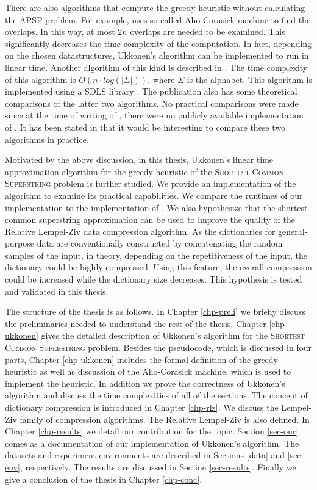\documentclass[english,twoside,censored,csm,algorithms-track-2020]{HYthesisML}
\theoremstyle{plain}
\theoremstyle{definition}
\begin{document}
There are also algorithms that compute the greedy heuristic without calculating the APSP problem.
For example, \citep{Ukkonen90} uses so-called Aho-Corasick machine to find the overlaps. In this way,
at most $2n$ overlaps are needed to be examined. This significantly decreases the time complexity of
the computation. In fact, depending on the chosen datastructures, Ukkonen's algorithm can be implemented
to run in linear time.
Another algorithm of this kind is described in \citep{Alanko17}.
The time complexity of this
algorithm is $O(n\cdot log(|\Sigma|))$, where $\Sigma$ is the alphabet.
This algorithm is implemented using a SDLS library  \citep{SDLS}. The publication also has some
theoretical comparisons of the latter two algorithms. No practical comparisons were made since at the
time of writing of \citep{Alanko17}, there were no publicly available implementation of
\citep{Ukkonen90}. It has been stated in \citep{Alanko17} that
it would be interesting to compare these two algorithms in practice.

Motivated by the above discussion, in this thesis, Ukkonen's linear time approximation algorithm
for the greedy heuristic of the \textsc{Shortest Common Superstring} problem is further studied.
We provide an implementation of the algorithm to examine its practical capabilities.
We compare the runtimes of our implementation to the implementation of \citep{Alanko17}.
We also hypothesize that the shortest common superstring approximation can be used to
improve the quality of the Relative Lempel-Ziv data compression algorithm. As the dictionaries
for general-purpose data are conventionally
constructed by concatenating the random samples of the input, in theory,
depending on the repetitiveness of the input, the dictionary could be highly compressed.
Using this feature, the overall compression could be increased while the dictionary size
decreases. This hypothesis is tested and validated in this thesis. 

The structure of the thesis is as follows. In Chapter \ref{chp-preli} we briefly discuss the
preliminaries needed to understand the rest of the thesis. Chapter \ref{chp-ukkonen} gives the detailed
description of Ukkonen's algorithm for the \textsc{Shortest Common Superstring} problem.
Besides the pseudocode, which is discussed in four parts, Chapter \ref{chp-ukkonen} includes the
formal definition of the greedy heuristic as well as discussion of the Aho-Corasick machine,
which is used to implement the heuristic. In addition we prove the correctness of Ukkonen's algorithm
and discuss the time complexities of all of the sections. The concept of dictionary compression is
introduced in Chapter \ref{chp-rlz}. We discuss the Lempel-Ziv family of compression algorithms. The
Relative Lempel-Ziv is also defined. In Chapter \ref{chp-results} we detail our contribution for
the topic. Section \ref{sec-our} comes as a documentation of our implementation of Ukkonen's
algorithm. The datasets and experiment environments are described in Sections \ref{data} and
\ref{sec-env}, respectively. The results are discussed in Section \ref{sec-results}.
Finally we give a conclusion of the thesis in Chapter \ref{chp-conc}.
\end{document}
